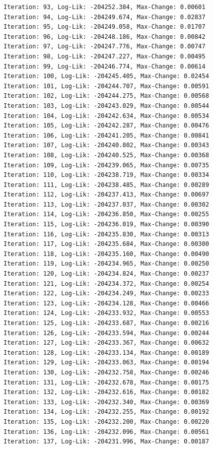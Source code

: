 \documentclass[
  letterpaper,
  DIV=11,
  numbers=noendperiod]{scrreport}
\begin{document}
\begin{verbatim}
Iteration: 93, Log-Lik: -204252.384, Max-Change: 0.00601
Iteration: 94, Log-Lik: -204249.674, Max-Change: 0.02837
Iteration: 95, Log-Lik: -204249.058, Max-Change: 0.01707
Iteration: 96, Log-Lik: -204248.186, Max-Change: 0.00842
Iteration: 97, Log-Lik: -204247.776, Max-Change: 0.00747
Iteration: 98, Log-Lik: -204247.227, Max-Change: 0.00495
Iteration: 99, Log-Lik: -204246.774, Max-Change: 0.00614
Iteration: 100, Log-Lik: -204245.405, Max-Change: 0.02454
Iteration: 101, Log-Lik: -204244.707, Max-Change: 0.00591
Iteration: 102, Log-Lik: -204244.275, Max-Change: 0.00568
Iteration: 103, Log-Lik: -204243.029, Max-Change: 0.00544
Iteration: 104, Log-Lik: -204242.634, Max-Change: 0.00534
Iteration: 105, Log-Lik: -204242.287, Max-Change: 0.00476
Iteration: 106, Log-Lik: -204241.205, Max-Change: 0.00841
Iteration: 107, Log-Lik: -204240.802, Max-Change: 0.00343
Iteration: 108, Log-Lik: -204240.525, Max-Change: 0.00368
Iteration: 109, Log-Lik: -204239.065, Max-Change: 0.00735
Iteration: 110, Log-Lik: -204238.719, Max-Change: 0.00334
Iteration: 111, Log-Lik: -204238.485, Max-Change: 0.00289
Iteration: 112, Log-Lik: -204237.413, Max-Change: 0.00697
Iteration: 113, Log-Lik: -204237.037, Max-Change: 0.00302
Iteration: 114, Log-Lik: -204236.850, Max-Change: 0.00255
Iteration: 115, Log-Lik: -204236.019, Max-Change: 0.00390
Iteration: 116, Log-Lik: -204235.830, Max-Change: 0.00313
Iteration: 117, Log-Lik: -204235.684, Max-Change: 0.00300
Iteration: 118, Log-Lik: -204235.160, Max-Change: 0.00490
Iteration: 119, Log-Lik: -204234.965, Max-Change: 0.00250
Iteration: 120, Log-Lik: -204234.824, Max-Change: 0.00237
Iteration: 121, Log-Lik: -204234.372, Max-Change: 0.00254
Iteration: 122, Log-Lik: -204234.249, Max-Change: 0.00233
Iteration: 123, Log-Lik: -204234.128, Max-Change: 0.00466
Iteration: 124, Log-Lik: -204233.932, Max-Change: 0.00553
Iteration: 125, Log-Lik: -204233.687, Max-Change: 0.00216
Iteration: 126, Log-Lik: -204233.594, Max-Change: 0.00244
Iteration: 127, Log-Lik: -204233.367, Max-Change: 0.00632
Iteration: 128, Log-Lik: -204233.134, Max-Change: 0.00189
Iteration: 129, Log-Lik: -204233.063, Max-Change: 0.00194
Iteration: 130, Log-Lik: -204232.758, Max-Change: 0.00246
Iteration: 131, Log-Lik: -204232.678, Max-Change: 0.00175
Iteration: 132, Log-Lik: -204232.616, Max-Change: 0.00182
Iteration: 133, Log-Lik: -204232.340, Max-Change: 0.00369
Iteration: 134, Log-Lik: -204232.255, Max-Change: 0.00192
Iteration: 135, Log-Lik: -204232.200, Max-Change: 0.00220
Iteration: 136, Log-Lik: -204232.096, Max-Change: 0.00561
Iteration: 137, Log-Lik: -204231.996, Max-Change: 0.00187

\end{verbatim}
\end{document}
